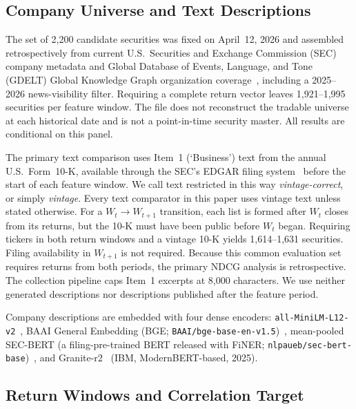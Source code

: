 \documentclass[sigconf,anonymous]{acmart}
\begin{document}
\subsection{Company Universe and Text Descriptions}
\label{sec:universe}

The set of 2,200 candidate securities was fixed on April~12, 2026 and assembled
retrospectively from current U.S.\ Securities and Exchange
Commission (SEC) company metadata and Global Database of Events, Language, and
Tone (GDELT) Global Knowledge Graph organization
coverage~\citep{gdelt_current}, including a 2025--2026 news-visibility filter.
Requiring a complete return vector leaves 1,921--1,995 securities per feature
window.  The file does not reconstruct the tradable universe at each historical
date and is not a point-in-time security master.  All results are conditional on
this panel.

The primary text comparison uses Item~1 (`Business') text from the annual U.S.\
Form~10-K, available through the SEC's EDGAR filing system~\citep{sec_edgar}
before the start of each feature window.  We call text restricted in this way
\emph{vintage-correct}, or simply \emph{vintage}.  Every text comparator in this
paper uses vintage text unless stated otherwise.
For a $W_t\!\to\!W_{t+1}$ transition, each list is formed after $W_t$ closes from
its returns, but the 10-K must have been public before $W_t$ began.  Requiring
tickers in both return windows and a vintage 10-K yields 1,614--1,631
securities.  Filing availability in $W_{t+1}$ is not required.  Because this
common evaluation set requires returns from both periods, the primary NDCG
analysis is retrospective.  The collection pipeline caps Item~1 excerpts at
8,000 characters.  We use neither generated descriptions nor descriptions
published after the feature period.

\begin{sloppypar}%
Company descriptions are embedded with four dense encoders:
\texttt{all-MiniLM-L12-v2}~\citep{reimers2019sentence,wang2020minilm},
BAAI General Embedding (BGE; \texttt{BAAI/bge-base-en-v1.5})~\citep{xiao2023bge},
mean-pooled SEC-BERT (a filing-pre-trained BERT released with FiNER;
\texttt{nlpaueb/sec-bert-base})~\citep{loukas2022secbert}, and
Granite-r2~\citep{granite2025embedding} (IBM, ModernBERT-based, 2025).
\end{sloppypar}

\subsection{Return Windows and Correlation Target}
\label{sec:target}
\end{document}
